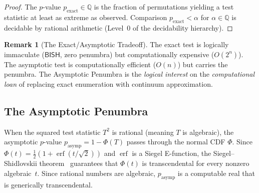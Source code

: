 \documentclass[11pt,a4paper]{article}
\theoremstyle{plain}
\theoremstyle{definition}
\newtheorem{remark}[theorem]{Remark}
\newcommand{\BISH}{\textsf{BISH}}
\newcommand{\Q}{\mathbb{Q}}
\renewcommand{\Phi}{\varPhi}
\begin{document}
\begin{proof}
The $p$-value $p_{\mathrm{exact}} \in \Q$ is the fraction of permutations yielding a test statistic at least as extreme as observed.  Comparison $p_{\mathrm{exact}} < \alpha$ for $\alpha \in \Q$ is decidable by rational arithmetic (Level~0 of the decidability hierarchy).
\end{proof}

\begin{remark}[The Exact/Asymptotic Tradeoff]
The exact test is logically immaculate ($\BISH$, zero penumbra) but computationally expensive ($O(2^n)$).  The asymptotic test is computationally efficient ($O(n)$) but carries the penumbra.  The Asymptotic Penumbra is the \emph{logical interest} on the \emph{computational loan} of replacing exact enumeration with continuum approximation.
\end{remark}

\subsection{The Asymptotic Penumbra}

When the squared test statistic $T^2$ is rational (meaning $T$ is algebraic), the asymptotic $p$-value $p_{\mathrm{asymp}} = 1 - \Phi(T)$ passes through the normal CDF $\Phi$.  Since $\Phi(t) = \tfrac{1}{2}(1 + \operatorname{erf}(t/\sqrt{2}))$ and $\operatorname{erf}$ is a Siegel E-function, the Siegel--Shidlovskii theorem~\cite{siegel1929,shidlovskii1989} guarantees that $\Phi(t)$ is transcendental for every nonzero algebraic~$t$.  Since rational numbers are algebraic, $p_{\mathrm{asymp}}$ is a computable real that is generically transcendental.
\end{document}
